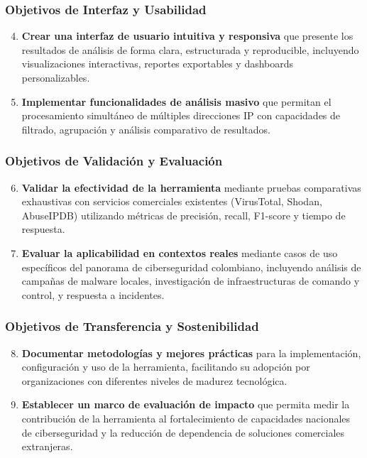 \subsubsection{Objetivos de Interfaz y Usabilidad}
\begin{enumerate}
    \setcounter{enumi}{3}
    \item \textbf{Crear una interfaz de usuario intuitiva y responsiva} que presente los resultados de análisis de forma clara, estructurada y reproducible, incluyendo visualizaciones interactivas, reportes exportables y dashboards personalizables.
    
    \item \textbf{Implementar funcionalidades de análisis masivo} que permitan el procesamiento simultáneo de múltiples direcciones IP con capacidades de filtrado, agrupación y análisis comparativo de resultados.
\end{enumerate}

\subsubsection{Objetivos de Validación y Evaluación}
\begin{enumerate}
    \setcounter{enumi}{5}
    \item \textbf{Validar la efectividad de la herramienta} mediante pruebas comparativas exhaustivas con servicios comerciales existentes (VirusTotal, Shodan, AbuseIPDB) utilizando métricas de precisión, recall, F1-score y tiempo de respuesta.
    
    \item \textbf{Evaluar la aplicabilidad en contextos reales} mediante casos de uso específicos del panorama de ciberseguridad colombiano, incluyendo análisis de campañas de malware locales, investigación de infraestructuras de comando y control, y respuesta a incidentes.
\end{enumerate}

\subsubsection{Objetivos de Transferencia y Sostenibilidad}
\begin{enumerate}
    \setcounter{enumi}{7}
    \item \textbf{Documentar metodologías y mejores prácticas} para la implementación, configuración y uso de la herramienta, facilitando su adopción por organizaciones con diferentes niveles de madurez tecnológica.
    
    \item \textbf{Establecer un marco de evaluación de impacto} que permita medir la contribución de la herramienta al fortalecimiento de capacidades nacionales de ciberseguridad y la reducción de dependencia de soluciones comerciales extranjeras.
\end{enumerate}

